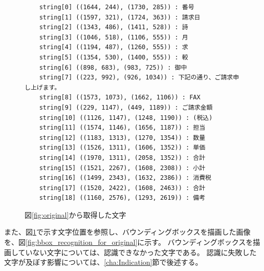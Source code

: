 \lstset{language=}
\begin{figure}[t]
    \begin{lstlisting}
    string[0] ((1644, 244), (1730, 285)) : 番号
    string[1] ((1597, 321), (1724, 363)) : 請求日
    string[2] ((1343, 486), (1411, 528)) : 詩
    string[3] ((1046, 518), (1106, 555)) : 月
    string[4] ((1194, 487), (1260, 555)) : 求
    string[5] ((1354, 530), (1400, 555)) : 較
    string[6] ((898, 683), (983, 725)) : 御中
    string[7] ((223, 992), (926, 1034)) : 下記の通り、ご請求申し上げます。
    string[8] ((1573, 1073), (1662, 1106)) : FAX
    string[9] ((229, 1147), (449, 1189)) : ご請求金額
    string[10] ((1126, 1147), (1248, 1190)) : (税込)
    string[11] ((1574, 1146), (1656, 1187)) : 担当
    string[12] ((1183, 1313), (1270, 1354)) : 数量
    string[13] ((1526, 1311), (1606, 1352)) : 単価
    string[14] ((1970, 1311), (2058, 1352)) : 合計
    string[15] ((1521, 2267), (1608, 2308)) : 小計
    string[16] ((1499, 2343), (1632, 2386)) : 消費税
    string[17] ((1520, 2422), (1608, 2463)) : 合計
    string[18] ((1160, 2576), (1293, 2619)) : 備考
    \end{lstlisting}
    \caption{図\ref{fig:original}から取得した文字}
    \label{fig:char_recognition_for_original}
\end{figure}

また、図\ref{fig:char_recognition_for_original}で示す文字位置を参照し、バウンディングボックスを描画した画像を、図\ref{fig:bbox_recognition_for_original}に示す。
バウンディングボックスを描画していない文字については、認識できなかった文字である。
認識に失敗した文字が及ぼす影響については、\ref{cha:Indication}節で後述する。

